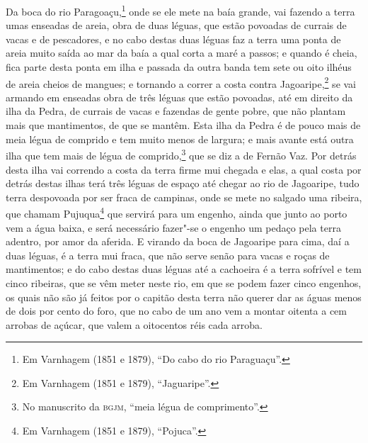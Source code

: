Da boca do rio Paragoaçu,\footnote{ Em Varnhagem (1851 e 1879), ``Do cabo do rio
Paraguaçu''.} onde se ele mete na baía grande, vai fazendo a terra umas enseadas de areia,
obra de duas léguas, que estão povoadas de currais de vacas e de pescadores, e no cabo
destas duas léguas faz a terra uma ponta de areia muito saída ao mar da baía a qual corta
a maré a passos; e quando é cheia, fica parte desta ponta em ilha e passada da outra banda
tem sete ou oito ilhéus de areia cheios de mangues; e tornando a correr a costa contra
Jagoaripe,\footnote{ Em Varnhagem (1851 e 1879), ``Jaguaripe''.} se vai armando em
enseadas obra de três léguas que estão povoadas, até em direito da ilha da Pedra, de
currais de vacas e fazendas de gente pobre, que não plantam mais que mantimentos, de que
se mantêm. Esta ilha da Pedra é de pouco mais de meia légua de comprido e tem muito menos
de largura; e mais avante está outra ilha que tem mais de légua de comprido,\footnote{ No
manuscrito da \textsc{bgjm}, ``meia légua de comprimento''.} que se diz a de Fernão Vaz.
Por detrás desta ilha vai correndo a costa da terra firme mui chegada e elas, a qual costa
por detrás destas ilhas terá três léguas de espaço até chegar ao rio de Jagoaripe, tudo
terra despovoada por ser fraca de campinas, onde se mete no salgado uma ribeira, que
chamam Pujuqua\footnote{ Em Varnhagem (1851 e 1879), ``Pojuca''.} que servirá para um
engenho, ainda que junto ao porto vem a água baixa, e será necessário fazer"-se o engenho
um pedaço pela terra adentro, por amor da aferida. E virando da boca de Jagoaripe para
cima, daí a duas léguas, é a terra mui fraca, que não serve senão para vacas e roças de
mantimentos; e do cabo destas duas léguas até a cachoeira é a terra sofrível e tem cinco
ribeiras, que se vêm meter neste rio, em que se podem fazer cinco engenhos, os quais não
são já feitos por o capitão desta terra não querer dar as águas menos de dois por cento do
foro, que no cabo de um ano vem a montar oitenta a cem arrobas de açúcar, que valem a
oitocentos réis cada arroba.

